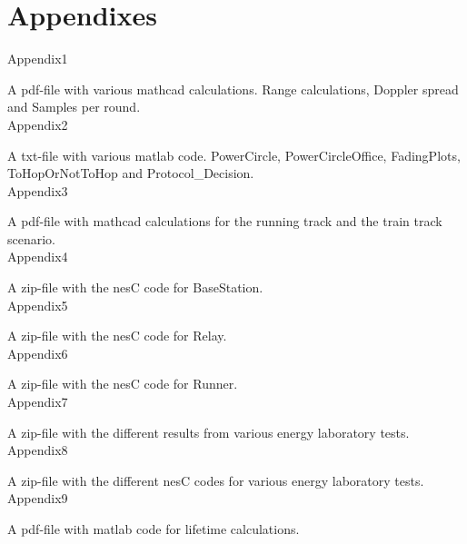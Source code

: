 
 \label{sc:bibliography}

\section*{Appendixes}
\noindent Appendix1

A pdf-file with various mathcad calculations. Range calculations, Doppler spread and Samples per round.\\

\noindent Appendix2

A txt-file with various matlab code. PowerCircle, PowerCircleOffice, FadingPlots, ToHopOrNotToHop and Protocol\_Decision.\\

\noindent Appendix3

A pdf-file with mathcad calculations for the running track and the train track scenario.\\

\noindent Appendix4

A zip-file with the nesC code for BaseStation.\\

\noindent Appendix5

A zip-file with the nesC code for Relay.\\

\noindent Appendix6

A zip-file with the nesC code for Runner.\\

\noindent Appendix7

A zip-file with the different results from various energy laboratory tests.\\

\noindent Appendix8

A zip-file with the different nesC codes for various energy laboratory tests.\\

\noindent Appendix9

A pdf-file with matlab code for lifetime calculations.\\

